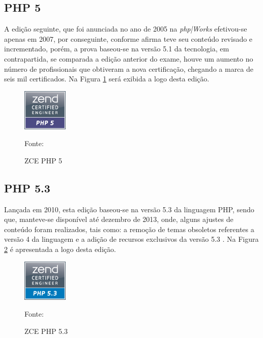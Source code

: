 \FloatBarrier 	%

\subsection{PHP 5}

A edição seguinte, que foi anunciada no ano de 2005 na \textit{php|Works}
efetivou-se apenas em 2007, por conseguinte, conforme afirma
 teve seu conteúdo revisado e incrementado,
porém, a prova baseou-se na versão 5.1 da tecnologia, em contrapartida, se 
comparada a edição anterior do exame, houve um aumento no número de
profissionais  que obtiveram a nova certificação, chegando a marca de seis mil 
certificados. Na Figura \ref{fig:logoCertificationPHP5} será exibida a logo 
desta edição.

\begin{figure}[h!tb]
	\caption{ZCE PHP 5}
	\label{fig:logoCertificationPHP5}

	\centering
	\includegraphics[width=0.19\textwidth]{images/logo/php5.png}

	\centering
	\footnotesize Fonte: 
\end{figure}

\FloatBarrier 	%

\subsection{PHP 5.3}

Lançada em 2010, esta edição baseou-se na versão 5.3 da linguagem \acs{PHP},
sendo que, manteve-se disponível até dezembro de 2013, onde, alguns ajustes de
conteúdo foram realizados, tais como: a remoção de temas obsoletos referentes a versão 4
da linguagem e a adição de recursos exclusivos da versão 5.3
\cite{entrevistaAriZCEBrasil}. Na Figura \ref{fig:logoCertificationPHP53} é 
apresentada a logo desta edição.

\begin{figure}[h!tb]
	\caption{ZCE PHP 5.3}
	\label{fig:logoCertificationPHP53}

	\centering
	\includegraphics[width=0.19\textwidth]{images/logo/php5-3.png}

	\centering
	\footnotesize Fonte: 
\end{figure}

